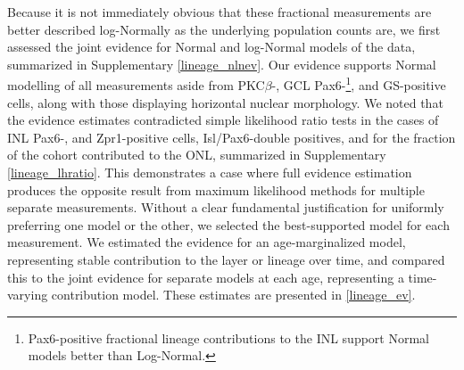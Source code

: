 Because it is not immediately obvious that these fractional measurements are better described log-Normally as the underlying population counts are, we first assessed the joint evidence for Normal and log-Normal models of the data, summarized in Supplementary \autoref{lineage_nlnev}. Our evidence supports Normal modelling of all measurements aside from PKC$\beta$-, GCL Pax6-\footnote{Pax6-positive fractional lineage contributions to the INL support Normal models better than Log-Normal.}, and GS-positive cells, along with those displaying horizontal nuclear morphology. We noted that the evidence estimates contradicted simple likelihood ratio tests in the cases of INL Pax6-, and Zpr1-positive cells, Isl/Pax6-double positives, and for the fraction of the cohort contributed to the ONL, summarized in Supplementary \autoref{lineage_lhratio}. This demonstrates a case where full evidence estimation produces the opposite result from maximum likelihood methods for multiple separate measurements.  Without a clear fundamental justification for uniformly preferring one model or the other, we selected the best-supported model for each measurement. We estimated the evidence for an age-marginalized model, representing stable contribution to the layer or lineage over time, and compared this to the joint evidence for separate models at each age, representing a time-varying contribution model. These estimates are presented in \autoref{lineage_ev}.

